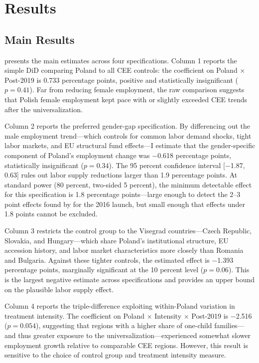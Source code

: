 \documentclass[12pt]{article}
\begin{document}
\section{Results}

\subsection{Main Results}

 presents the main estimates across four specifications. Column 1 reports the simple DiD comparing Poland to all CEE controls: the coefficient on Poland $\times$ Post-2019 is 0.733 percentage points, positive and statistically insignificant ($p = 0.41$). Far from reducing female employment, the raw comparison suggests that Polish female employment kept pace with or slightly exceeded CEE trends after the universalization.

Column 2 reports the preferred gender-gap specification. By differencing out the male employment trend---which controls for common labor demand shocks, tight labor markets, and EU structural fund effects---I estimate that the gender-specific component of Poland's employment change was $-$0.618 percentage points, statistically insignificant ($p = 0.34$). The 95 percent confidence interval [$-$1.87, 0.63] rules out labor supply reductions larger than 1.9 percentage points. At standard power (80 percent, two-sided 5 percent), the minimum detectable effect for this specification is 1.8 percentage points---large enough to detect the 2--3 point effects found by \citet{magda2018} for the 2016 launch, but small enough that effects under 1.8 points cannot be excluded.

Column 3 restricts the control group to the Visegrad countries---Czech Republic, Slovakia, and Hungary---which share Poland's institutional structure, EU accession history, and labor market characteristics more closely than Romania and Bulgaria. Against these tighter controls, the estimated effect is $-$1.393 percentage points, marginally significant at the 10 percent level ($p = 0.06$). This is the largest negative estimate across specifications and provides an upper bound on the plausible labor supply effect.

Column 4 reports the triple-difference exploiting within-Poland variation in treatment intensity. The coefficient on Poland $\times$ Intensity $\times$ Post-2019 is $-$2.516 ($p = 0.054$), suggesting that regions with a higher share of one-child families---and thus greater exposure to the universalization---experienced somewhat slower employment growth relative to comparable CEE regions. However, this result is sensitive to the choice of control group and treatment intensity measure.
\end{document}
